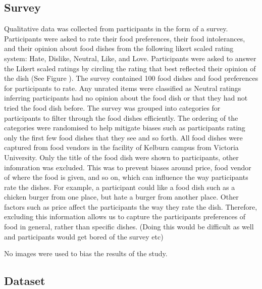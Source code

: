 
\subsection{Survey}

Qualitative data was collected from participants in the form of a survey. Participants were asked to rate their food preferences, their food intolerances, and their opinion about food dishes from the following likert scaled rating system: Hate, Dislike, Neutral, Like, and Love. Participants were asked to answer the Likert scaled ratings by circling the rating that best reflected their opinion of the dish (See Figure ). The survey contained 100 food dishes and  food preferences for  participants to rate. Any unrated items were classified as Neutral ratings inferring participants had no opinion about the food dish or that they had not tried the food dish before. The survey was grouped into categories for participants to filter through the food dishes efficiently. The ordering of the categories were randomised to help mitigate biases such as participants rating only the first few food dishes that they see and so forth. All food dishes were captured from food vendors in the facility of Kelburn campus from Victoria University. Only the title of the food dish were shown to participants, other infomration was excluded. This was to prevent biases around price, food vendor of where the food is given, and so on, which can influence the way participants rate the dishes. For example, a participant could like a food dish such as a chicken burger from one place, but hate a burger from another place. Other factors such as price affect the participants the way they rate the dish. Therefore, excluding this information allows us to capture the participants preferences of food in general, rather than specific dishes.  (Doing this would be difficult as well and participants would get bored of the survey etc)

No images were used to bias the results of the study. 

\subsection{Dataset}



